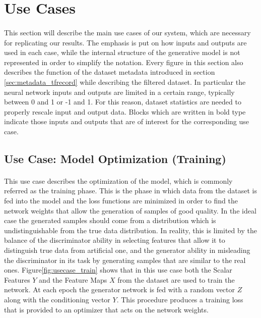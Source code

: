\section{Use Cases}
\label{sec:usecases}
\paragraph{} This section will describe the main use cases of our system, which are necessary for replicating our results. The emphasis is put on how inputs and outputs are used in each case, while the internal structure of the generative model is not represented in order to simplify the notation. Every figure in this section also describes the function of the dataset metadata introduced in section \ref{sec:metadata_tfrecord} while describing the filtered dataset. In particular the neural network inputs and outputs are limited in a certain range, typically between 0 and 1 or -1 and 1. For this reason, dataset statistics are needed to properly rescale input and output data. Blocks which are written in bold type indicate those inputs and outputs that are of interest for the corresponding use case.

\subsection{Use Case: Model Optimization (Training)}
\label{sec:usecase_train}
\paragraph{} This use case describes the optimization of the model, which is commonly referred as the training phase. This is the phase in which data from the dataset is fed into the model and the loss functions are minimized in order to find the network weights that allow the generation of samples of good quality. In the ideal case the generated samples should come from a distribution which is undistinguishable from the true data distribution. In reality, this is limited by the balance of the discriminator ability in selecting features that allow it to distinguish true data from artificial one, and the generator ability in misleading the discriminator in its task by generating samples that are similar to the real ones. Figure\ref{fig:usecase_train} shows that in this use case both the Scalar Features $Y$ and the Feature Maps $X$ from the dataset are used to train the network. At each epoch the generator network is fed with a random vector $Z$ along with the conditioning vector $Y$. This procedure produces a training loss that is provided to an optimizer that acts on the network weights. 

